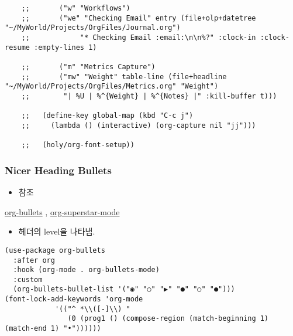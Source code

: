 \documentclass[11pt]{article}
\begin{document}
\begin{verbatim}
    ;;       ("w" "Workflows")
    ;;       ("we" "Checking Email" entry (file+olp+datetree "~/MyWorld/Projects/OrgFiles/Journal.org")
    ;;            "* Checking Email :email:\n\n%?" :clock-in :clock-resume :empty-lines 1)

    ;;       ("m" "Metrics Capture")
    ;;       ("mw" "Weight" table-line (file+headline "~/MyWorld/Projects/OrgFiles/Metrics.org" "Weight")
    ;;        "| %U | %^{Weight} | %^{Notes} |" :kill-buffer t)))

    ;;   (define-key global-map (kbd "C-c j")
    ;;     (lambda () (interactive) (org-capture nil "jj")))

    ;;   (holy/org-font-setup))

\end{verbatim}

\subsubsection*{Nicer Heading Bullets}
\label{sec:orgb25a72a}
\begin{itemize}
\item 참조
\end{itemize}
\href{https://github.com/sabof/org-bullets}{org-bullets} , \href{https://github.com/integral-dw/org-superstar-mode}{org-superstar-mode} 
\begin{itemize}
\item 헤더의 level을 나타냄.
\end{itemize}

\begin{verbatim}
(use-package org-bullets
  :after org
  :hook (org-mode . org-bullets-mode)
  :custom
  (org-bullets-bullet-list '("◉" "○" "▶" "●" "○" "●")))
(font-lock-add-keywords 'org-mode
			'(("^ *\\([-]\\) "
			   (0 (prog1 () (compose-region (match-beginning 1) (match-end 1) "•"))))))
\end{verbatim}
\end{document}
